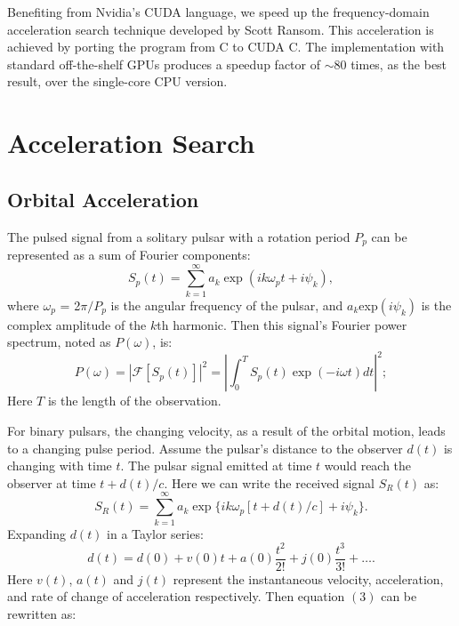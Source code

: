\documentclass[preprint2]{aastex}
\begin{document}
Benefiting from Nvidia's CUDA language, we speed up the frequency-domain acceleration search 
technique developed by Scott Ransom. This acceleration is achieved by porting the program from C to CUDA C. The implementation with standard 
off-the-shelf GPUs produces a speedup factor of $\sim$80 times, as the best result, over the single-core CPU version.


\section{Acceleration Search}

\subsection{Orbital Acceleration}

The pulsed signal from a solitary pulsar with a rotation period $P_p$ can 
be represented as a sum of Fourier components:
\begin{equation}
S_p(t)=\sum_{k=1}^{\infty}a_k \exp (ik\omega_pt+i\psi_k),
\end{equation}
where $\omega_p$ = 2$\pi$$/$$P_p$ is the angular frequency of the pulsar, and 
$a_k$exp$(i\psi_k)$ is the complex amplitude of the $k$th harmonic. 
Then this signal's Fourier power spectrum, noted as $P(\omega)$, is:
\begin{equation}
P(\omega)=|\mathcal{F}[S_p(t)]|^2=|\int_{0}^{T}S_p(t)\exp (-i\omega t)dt|^2;
\end{equation}
Here $T$ is the length of the observation. 


For binary pulsars, the changing velocity, as a result of the orbital motion,
 leads to a changing pulse period.
Assume the pulsar's distance to the observer $d(t)$ is changing with 
time $t$. The pulsar signal emitted at time $t$ would reach the observer 
at time $t+d(t)/c$. Here we can write the received signal $S_R(t)$ as:
\begin{equation}
S_R(t)=\sum_{k=1}^{\infty}a_k \exp \{ik\omega_p[t+d(t)/c] + i\psi_k \}.
\end{equation}
Expanding $d(t)$ in a Taylor series:
\begin{equation}
d(t)=d(0) + v(0)t + a(0)\frac{t^2}{2!} + j(0)\frac{t^3}{3!}+\ldots.
\end{equation}
Here $v(t)$, $a(t)$ and $j(t)$ represent the instantaneous velocity, acceleration, and rate 
of change of acceleration respectively. Then equation $(3)$ can be rewritten as:
\end{document}
